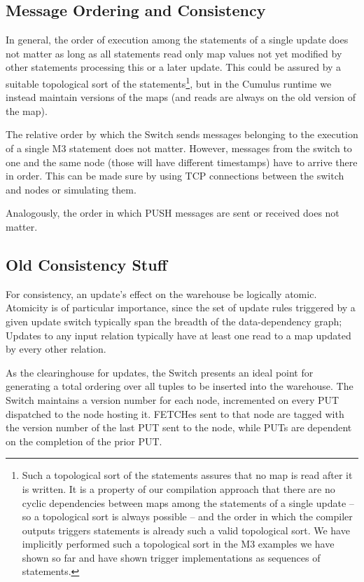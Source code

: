\subsection{Message Ordering and Consistency}


In general, the order of execution among the statements of a single update
does not matter as long as all
statements read only map values not yet modified by other statements processing
this or a later update. This could be assured by a suitable topological sort of
the statements\footnote{Such a topological sort of the statements
assures that no map is read after it is written.
It is a property of our compilation approach that there are no cyclic dependencies between maps among the statements of a single update -- so a topological sort is always possible -- and the order in which the
compiler outputs triggers statements is already such a valid
topological sort.
We have implicitly performed such a topological sort in the M3 examples we have
shown so far and have shown trigger implementations as sequences of
statements.}, but in the Cumulus runtime we instead maintain versions of
the maps (and reads are always on the old version of the map).


The relative order by which the Switch sends messages
belonging to the execution of a single M3 statement does not matter.
However, messages from the switch to one and the same node
(those will have different timestamps) have to arrive there in order.
This can be made sure by using TCP connections between the switch and nodes
or simulating them.

Analogously, the order in which PUSH messages are sent or received does not matter.



\subsection{Old Consistency Stuff}


For consistency, an update's effect on the warehouse be logically atomic.  Atomicity is of particular importance, since the set of update rules triggered by a given update switch typically span the breadth of the data-dependency graph; Updates to any input relation typically have at least one read to a map updated by every other relation.

As the clearinghouse for updates, the Switch presents an ideal point for generating a total ordering over all tuples to be inserted into the warehouse.  The Switch maintains a version number for each node, incremented on every PUT dispatched to the node hosting it.  FETCHes sent to that node are tagged with the version number of the last PUT sent to the node, while PUTs are dependent on the completion of the prior PUT.

